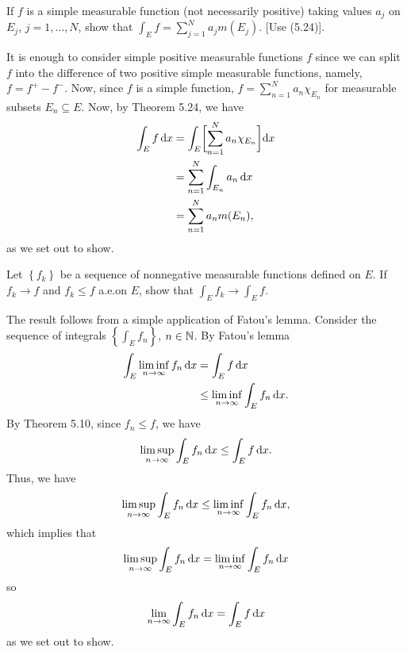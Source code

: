 \begin{problem}
  If $f$ is a simple measurable function (not necessarily positive) taking
  values $a_j$ on $E_j$, $j=1,\ldots,N$, show that
  $\int_E f=\sum_{j=1}^N a_jm(E_j)$. [Use (5.24)].
\end{problem}
\begin{solution}
  It is enough to consider simple positive measurable functions $f$ since
  we can split $f$ into the difference of two positive simple measurable
  functions, namely, $f=f^+-f^-$. Now, since $f$ is a simple function,
  $f=\sum_{n=1}^Na_n\chi_{E_n}$ for measurable subsets $E_n\subseteq
  E$. Now, by Theorem 5.24, we have
  \begin{align*}
    \int_E f\mathop{}\!\mathrm{d} x
    &=\int_E\biggl[ \sum_{n=1}^N a_n\chi_{E_n} \biggr]\mathrm{d} x\\
    &=\sum_{n=1}^N \int_{E_n} a_n\mathop{}\!\mathrm{d} x\\
    &=\sum_{n=1}^N a_n m(E_n),
  \end{align*}
  as we set out to show.
\end{solution}

\begin{problem}
  Let $\left\{f_k\right\}$ be a sequence of nonnegative measurable
  functions defined on $E$. If $f_k\to f$ and $f_k\leq f$ a.e.\@ on $E$,
  show that $\int_E f_k\to\int_E f$.
\end{problem}
\begin{solution}
  The result follows from a simple application of Fatou's lemma. Consider
  the sequence of integrals $\left\{\int_E f_n \right\}$, $n\in\mathbb{N}$. By
  Fatou's lemma
  \begin{align*}
    \int_E \liminf_{n\to\infty}f_n\mathop{}\!\mathrm{d} x
    &=\int_E f\mathop{}\!\mathrm{d} x\\
    &\leq\liminf_{n\to\infty}\int_E f_n\mathop{}\!\mathrm{d} x.
  \end{align*}
  By Theorem 5.10, since $f_n\leq f$, we have
  \[
    \limsup_{n\to\infty}\int_E f_n\mathop{}\!\mathrm{d} x\leq
    \int_E f\mathop{}\!\mathrm{d} x.
  \]
  Thus, we have
  \[
    \limsup_{n\to\infty}\int_E f_n\mathop{}\!\mathrm{d} x\leq
    \liminf_{n\to\infty}\int_E f_n\mathop{}\!\mathrm{d} x,
  \]
  which implies that
  \[
    \limsup_{n\to\infty}\int_E f_n\mathop{}\!\mathrm{d}
    x=\liminf_{n\to\infty}\int_E f_n\mathop{}\!\mathrm{d} x
  \]
  so
  \[
    \lim_{n\to\infty}\int_E f_n\mathop{}\!\mathrm{d} x=
    \int_Ef\mathop{}\!\mathrm{d} x
  \]
  as we set out to show.
\end{solution}

